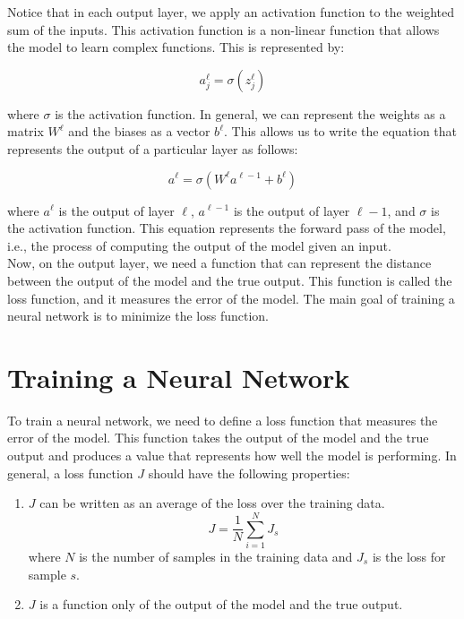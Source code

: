Notice that in each output layer, we apply an activation function to the weighted sum
of the inputs. This activation function is a non-linear function that allows the model
to learn complex functions. This is represented by:

\begin{equation}
    a_j^\ell = \sigma(z_j^\ell)
\end{equation}

where $\sigma$ is the activation function. In general, we can represent the weights
as a matrix $W^\ell$ and the biases as a vector $b^\ell$. This allows us to write
the equation that represents the output of a particular layer as follows:

\begin{equation}
    a^\ell = \sigma(W^\ell a^{\ell-1} + b^\ell)
\end{equation}
    
where $a^\ell$ is the output of layer $\ell$, $a^{\ell-1}$ is the output of layer
$\ell-1$, and $\sigma$ is the activation function. This equation represents the
forward pass of the model, i.e., the process of computing the output of the model
given an input.\\

Now, on the output layer, we need a function that can represent the distance between
the output of the model and the true output. This function is called the loss function,
and it measures the error of the model. The main goal of training a neural network is
to minimize the loss function.

\section{Training a Neural Network}

To train a neural network, we need to define a loss function that measures the error
of the model. This function takes the
output of the model and the true output and produces a value that represents how
well the model is performing. In general, a loss function $J$ should have the 
following properties:

\begin{enumerate}
    \item $J$ can be written as an average of the loss over the training data.
    $$J = \frac{1}{N} \sum_{i=1}^{N} J_s$$
    where $N$ is the number of samples in the training data and $J_s$ is the loss
    for sample $s$.

    \item $J$ is a function only of the output of the model and the true output.
\end{enumerate}

